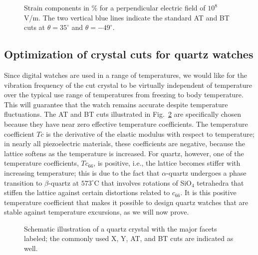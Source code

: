\begin{figure}[t]
\centering\leavevmode
\caption{\label{\chabbr:fig:qm}Strain components in \% for a perpendicular electric field of $10^8$ V/m.  The two vertical blue lines indicate the standard AT and BT cuts at $\theta=35^{\circ}$ and $\theta=-49^{\circ}$.}
\end{figure}

\subsection{Optimization of crystal cuts for quartz watches} 
Since digital watches are used in a range of temperatures, we would like for the vibration frequency of the cut crystal to be virtually independent of temperature over the typical use range of temperatures from freezing to body temperature.  This will guarantee that the watch remains accurate despite temperature fluctuations.  The AT and BT cuts illustrated in Fig.~\ref{\chabbr:fig:quartzcuts} are specifically chosen because they have near zero effective temperature coefficients.  The temperature coefficient $T\!c$ is the derivative of the elastic modulus with respect to temperature; in nearly all piezoelectric materials, these coefficients are negative, because the lattice softens as the temperature is increased.  For quartz, however, one of the temperature coefficients, $T\!c_{66}$, is positive, i.e., the lattice becomes stiffer with increasing temperature; this is due to the fact that $\alpha$-quartz undergoes a phase transition to $\beta$-quartz at $573^{\circ}$C that involves rotations of SiO$_4$ tetrahedra that stiffen the lattice against certain distortions related to $c_{66}$.  It is this positive temperature coefficient that makes it possible to design quartz watches that are stable against temperature excursions, as we will now prove.

\begin{figure}[ht]
\centering\leavevmode
\caption{Schematic illustration of a quartz crystal with the major facets labeled; the commonly used X, Y, AT, and BT cuts are indicated as well.}
\label{\chabbr:fig:quartzcuts}
\end{figure}


